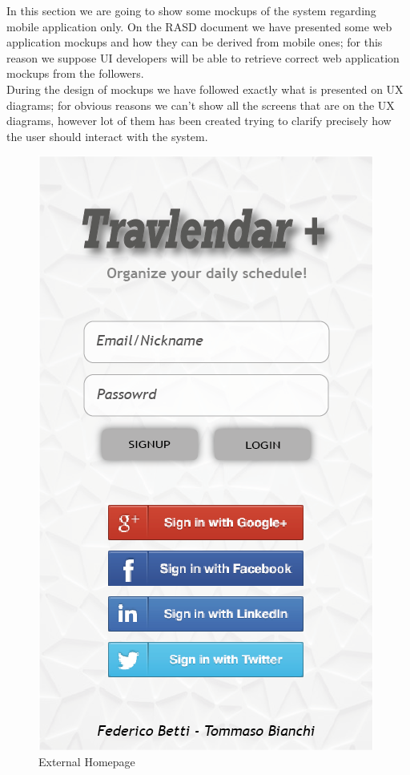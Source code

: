 In this section we are going to show some mockups of the system regarding mobile application only. On the RASD document we have presented some web application mockups and how they can be derived from mobile ones; for this reason we suppose UI developers will be able to retrieve correct web application mockups from the followers.\\
During the design of mockups we have followed exactly what is presented on UX diagrams; for obvious reasons we can't show all the screens that are on the UX diagrams, however lot of them has been created trying to clarify precisely how the user should interact with the system.\\


\begin{figure}[h]
	\centering\includegraphics[scale = 0.3]{Images/Mockups/HomePage.png}{}
	\caption{External Homepage}
\end{figure}

